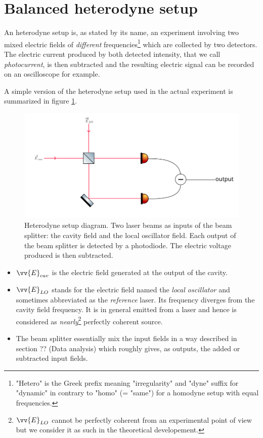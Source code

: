 \documentclass[11pt]{report}
\begin{document}
\section{Balanced heterodyne setup}

An heterodyne setup is, as stated by its name, an experiment involving two mixed electric fields of \textit{different} frequencies\footnote{"Hetero" is the Greek prefix meaning "irregularity" and "dyne" suffix for "dynamic" in contrary to "homo" (= "same") for a homodyne setup with equal frequencies.} which are collected by two detectors. The electric current produced by both detected intensity, that we call \textit{photocurrent}, is then subtracted and the resulting electric signal can be recorded on an oscilloscope for example. 

A simple version of the heterodyne setup used in the actual experiment is summarized in figure \ref{fig:heterodyne-fst}.

\begin{figure}[h!]
\centering
\includegraphics[width=\textwidth]{heterodyne-fst}
\caption{Heterodyne setup diagram. Two laser beams as inputs of the beam splitter: the cavity field and the local oscillator field. Each output of the beam splitter is detected by a photodiode. The electric voltage produced is then subtracted.}
\label{fig:heterodyne-fst}
\end{figure}

\begin{itemize}
 \item $\vv{E}_{cav}$ is the electric field generated at the output of the cavity.
 \item $\vv{E}_{LO}$ stands for the electric field named the \textit{local oscillator} and sometimes abbreviated as the \textit{reference} laser. Its frequency diverges from the cavity field frequency. It is in general emitted from a laser and hence is considered as \textit{nearly}\footnote{$\vv{E}_{LO}$ cannot be perfectly coherent from an experimental point of view but we consider it as such in the theoretical developement.} perfectly coherent source.
 \item The beam splitter essentially mix the input fields in a way described in section ?? (Data analysis) which roughly gives, as outputs, the added or subtracted input fields.
\end{itemize}
\end{document}
